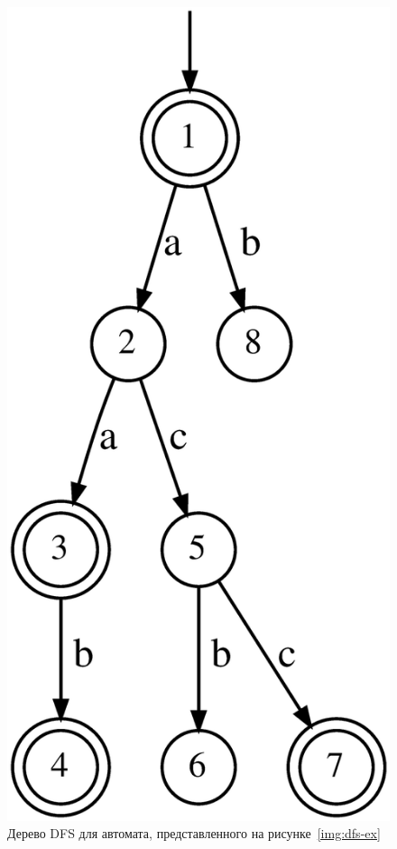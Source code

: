 \begin{figure}[ht]
  \centering
  \includegraphics[scale=0.12]{img/datamod/DFS-tree.eps}
  \caption{Дерево DFS для автомата, представленного на рисунке~\ref{img:dfs-ex}}
  \label{img:dfs-tree-ex}
\end{figure}

